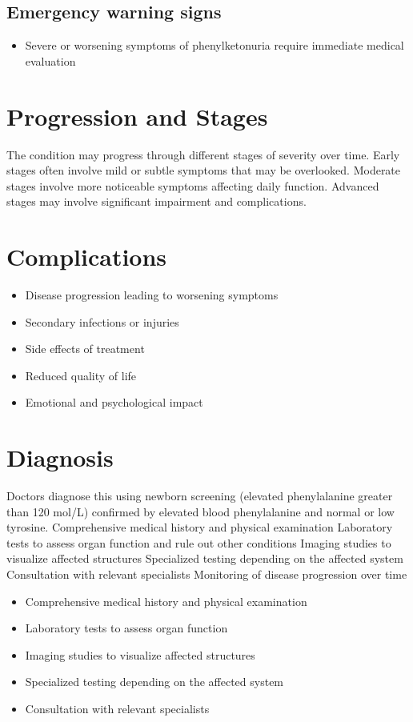 \subsection{Emergency warning signs}
\begin{itemize}[noitemsep]
  \item Severe or worsening symptoms of phenylketonuria require immediate medical evaluation
\end{itemize}
\section{Progression and Stages}
The condition may progress through different stages of severity over time. Early stages often involve mild or subtle symptoms that may be overlooked. Moderate stages involve more noticeable symptoms affecting daily function. Advanced stages may involve significant impairment and complications.
\section{Complications}
\begin{itemize}[noitemsep]
  \item Disease progression leading to worsening symptoms
  \item Secondary infections or injuries
  \item Side effects of treatment
  \item Reduced quality of life
  \item Emotional and psychological impact
\end{itemize}
\section{Diagnosis}
Doctors diagnose this using newborn screening (elevated phenylalanine greater than 120 \textmu mol/L) confirmed by elevated blood phenylalanine and normal or low tyrosine. Comprehensive medical history and physical examination Laboratory tests to assess organ function and rule out other conditions Imaging studies to visualize affected structures Specialized testing depending on the affected system Consultation with relevant specialists Monitoring of disease progression over time

\begin{itemize}[noitemsep]
  \item Comprehensive medical history and physical examination
  \item Laboratory tests to assess organ function
  \item Imaging studies to visualize affected structures
  \item Specialized testing depending on the affected system
  \item Consultation with relevant specialists
\end{itemize}
